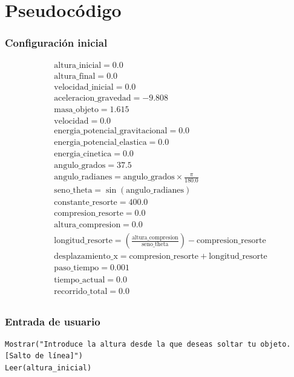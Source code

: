 \documentclass{article}
\begin{document}
\newpage
\section{Pseudocódigo}

\subsubsection*{Configuración inicial}
\begin{align*}
&\text{altura\_inicial} = 0.0 \\
&\text{altura\_final} = 0.0 \\
&\text{velocidad\_inicial} = 0.0 \\
&\text{aceleracion\_gravedad} = -9.808 \\
&\text{masa\_objeto} = 1.615 \\
&\text{velocidad} = 0.0 \\
&\text{energia\_potencial\_gravitacional} = 0.0 \\
&\text{energia\_potencial\_elastica} = 0.0 \\
&\text{energia\_cinetica} = 0.0 \\
&\text{angulo\_grados} = 37.5 \\
&\text{angulo\_radianes} = \text{angulo\_grados} \times \frac{\pi}{180.0} \\
&\text{seno\_theta} = \sin(\text{angulo\_radianes}) \\
&\text{constante\_resorte} = 400.0 \\
&\text{compresion\_resorte} = 0.0 \\
&\text{altura\_compresion} = 0.0 \\
&\text{longitud\_resorte} = \left(\frac{\text{altura\_compresion}}{\text{seno\_theta}}\right) - \text{compresion\_resorte} \\
&\text{desplazamiento\_x} = \text{compresion\_resorte} + \text{longitud\_resorte} \\
&\text{paso\_tiempo} = 0.001 \\
&\text{tiempo\_actual} = 0.0 \\
&\text{recorrido\_total} = 0.0 \\
\end{align*}

\subsubsection*{Entrada de usuario}
\begin{verbatim}
Mostrar("Introduce la altura desde la que deseas soltar tu objeto. [Salto de línea]")
Leer(altura_inicial)
\end{verbatim}
\end{document}
